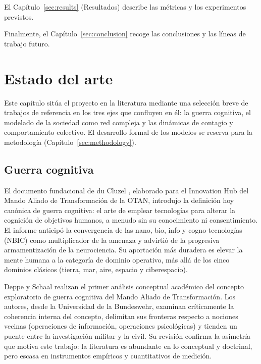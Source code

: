 \documentclass[12pt]{extarticle}
\numberwithin{equation}{section}
\begin{document}
\begin{refsection}
El Cap\'itulo~\ref{sec:results} (Resultados) describe las m\'etricas y los experimentos previstos. 

Finalmente, el Cap\'itulo~\ref{sec:conclusion} recoge las conclusiones y las l\'ineas de trabajo futuro.

\newpage

\section{Estado del arte}\label{sec:related}

Este cap\'itulo sit\'ua el proyecto en la literatura mediante una selecci\'on breve de trabajos de referencia en los tres ejes que confluyen en \'el: la guerra cognitiva, el modelado de la sociedad como red compleja y las din\'amicas de contagio y comportamiento colectivo. El desarrollo formal de los modelos se reserva para la metodolog\'ia (Cap\'itulo~\ref{sec:methodology}).

\subsection{Guerra cognitiva}

El documento fundacional de du Cluzel \cite{DuCluzel2021}, elaborado para el Innovation Hub del Mando Aliado de Transformaci\'on de la OTAN, introdujo la definici\'on hoy can\'onica de guerra cognitiva: el arte de emplear tecnolog\'ias para alterar la cognici\'on de objetivos humanos, a menudo sin su conocimiento ni consentimiento. El informe anticip\'o la convergencia de las nano, bio, info y cogno-tecnolog\'ias (NBIC) como multiplicador de la amenaza y advirti\'o de la progresiva armamentizaci\'on de la neurociencia. Su aportaci\'on m\'as duradera es elevar la mente humana a la categor\'ia de dominio operativo, m\'as all\'a de los cinco dominios cl\'asicos (tierra, mar, aire, espacio y ciberespacio).

Deppe y Schaal \cite{DeppeSchaal2024} realizan el primer an\'alisis conceptual acad\'emico del concepto exploratorio de guerra cognitiva del Mando Aliado de Transformaci\'on. Los autores, desde la Universidad de la Bundeswehr, examinan cr\'iticamente la coherencia interna del concepto, delimitan sus fronteras respecto a nociones vecinas (operaciones de informaci\'on, operaciones psicol\'ogicas) y tienden un puente entre la investigaci\'on militar y la civil. Su revisi\'on confirma la asimetr\'ia que motiva este trabajo: la literatura es abundante en lo conceptual y doctrinal, pero escasa en instrumentos emp\'iricos y cuantitativos de medici\'on.


\end{refsection}
\end{document}
